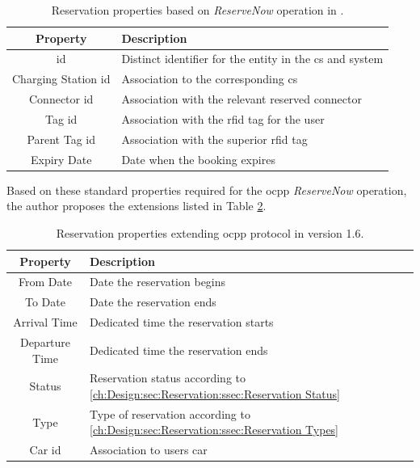 \begingroup
\setlength{\tabcolsep}{10pt} %
\renewcommand{\arraystretch}{1.5} %
\begin{table}[h]
    \centering
    \caption{Reservation properties based on \textit{ReserveNow} operation in \cite{noauthor_ocpp_nodate}.}
    \begin{tabular}{c|m{10cm}}
        Property & Description \\ \hline
        \acrshort{id} & Distinct identifier for the entity in the \acrshort{cs} and system \\
        Charging Station \acrshort{id} & Association to the corresponding \acrshort{cs} \\
        Connector \acrshort{id} & Association with the relevant reserved connector \\
        Tag \acrshort{id} & Association with the \acrshort{rfid} tag for the user \\
        Parent Tag \acrshort{id} & Association with the superior \acrshort{rfid} tag \\
        Expiry Date & Date when the booking expires
    \end{tabular}
    \label{tab:reservation-ocpp-properties}
\end{table}
\endgroup

\newpage

\noindent Based on these standard properties required for the \acrshort{ocpp} \textit{ReserveNow} operation, the author proposes the extensions listed in Table \ref{tab:reservation-extended-properties}.

\begingroup
\setlength{\tabcolsep}{10pt} %
\renewcommand{\arraystretch}{1.5} %
\begin{table}[h]
    \centering
    \caption{Reservation properties extending \acrshort{ocpp} protocol in version 1.6.}
    \begin{tabular}{c|m{10cm}}
        Property & Description \\ \hline
        From Date & Date the reservation begins \\
        To Date & Date the reservation ends \\
        Arrival Time & Dedicated time the reservation starts \\
        Departure Time & Dedicated time the reservation ends \\
        Status & Reservation status according to \ref{ch:Design:sec:Reservation:ssec:Reservation Status} \\
        Type & Type of reservation according to \ref{ch:Design:sec:Reservation:ssec:Reservation Types} \\
        Car \acrshort{id} & Association to users car
    \end{tabular}
    \label{tab:reservation-extended-properties}
\end{table}
\endgroup

